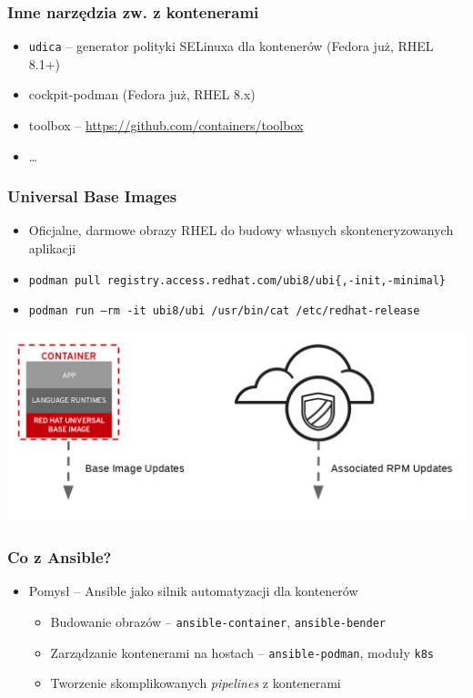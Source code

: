 \documentclass[dvipsnames,table]{beamer}
\begin{document}
\begin{frame}
	\frametitle{Inne narzędzia zw. z kontenerami}
	\begin{itemize}
		\item {\tt udica} -- generator polityki SELinuxa dla kontenerów (Fedora już, RHEL 8.1+)
		\item cockpit-podman (Fedora już, RHEL 8.x)
		\item toolbox -- \url{https://github.com/containers/toolbox}
		\item \ldots 
	\end{itemize}
\end{frame}

\begin{frame}
	\frametitle{Universal Base Images}
	\begin{itemize}
		\item Oficjalne, darmowe obrazy RHEL do budowy własnych skonteneryzowanych aplikacji
		\item {\tt podman pull registry.access.redhat.com/ubi8/ubi\{,-init,-minimal\}} 
		\item {\tt podman run --rm -it ubi8/ubi /usr/bin/cat /etc/redhat-release}
	\end{itemize}
	\begin{center}
		\includegraphics[scale=0.25]{img-ubiupdates.png}
	\end{center}
\end{frame}

\begin{frame}[fragile]
	\frametitle{Co z Ansible?}
	\begin{itemize}
		\item Pomysł -- Ansible jako silnik automatyzacji dla kontenerów
		\begin{itemize}
			\item Budowanie obrazów -- {\tt ansible-container}, {\tt ansible-bender}
			\item Zarządzanie kontenerami na hostach -- {\tt ansible-podman}, moduły {\tt k8s}
			\item Tworzenie skomplikowanych {\it pipelines} z kontenerami
		\end{itemize}
	\end{itemize}
\end{frame}
\end{document}
